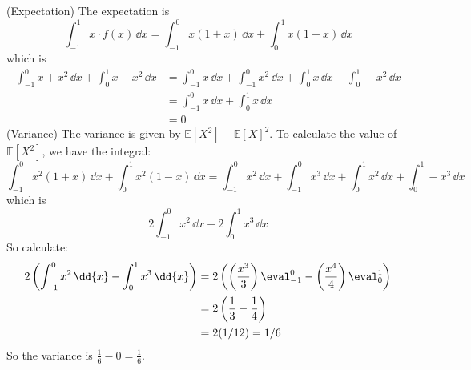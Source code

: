 \documentclass{article}
\begin{document}
\begin{answer}
        (Expectation) The expectation is 
            \begin{equation*}
                \int_{-1}^{1} x \cdot f(x) \, \dd{x} = \int_{-1}^{0} x(1 + x) \, \dd{x} + \int_{0}^{1} x(1 - x) \, \dd{x} 
            \end{equation*}
        which is 
            \begin{align*}
                \int_{-1}^{0} x + x^{2} \, \dd{x} + \int_{0}^{1} x - x^{2} \, \dd{x}  &= \int_{-1}^{0} x \, \dd{x} + \int_{-1}^{0} x^{2} \, \dd{x} + \int_{0}^{1} x \, \dd{x} + \int_{0}^{1} -x^{2} \, \dd{x}  \\
                                                                                      &= \int_{-1}^{0} x \, \dd{x} + \int_{0}^{1} x \, \dd{x}                                                                  \\
                                                                                      &= 0                                                                                                                       
            \end{align*}
        (Variance) The variance is given by $\mathbb{E}[X^{2}] - \mathbb{E}[X]^{2}$. To calculate the value of $\mathbb{E}[X^{2}]$, we have the integral:
            \begin{equation*}
                \int_{-1}^{0} x^{2}(1 + x) \, \dd{x} + \int_{0}^{1} x^{2}(1 - x) \, \dd{x} = \int_{-1}^{0} x^{2} \, \dd{x} + \int_{-1}^{0} x^{3} \, \dd{x} + \int_{0}^{1} x^{2} \, \dd{x}  + \int_{0}^{1} -x^{3} \, \dd{x} 
            \end{equation*}
        which is 
            \begin{equation*}
                2\int_{-1}^{0} x^{2} \, \dd{x} - 2\int_{0}^{1} x^{3} \, \dd{x} 
            \end{equation*}
        So calculate:
            \begin{align*}
                2\left(\int_{-1}^{0} x^{2} \, \dd{x} - \int_{0}^{1} x^{3} \, \dd{x} \right) &= 2\left(\left(\dfrac{x^{3}}{3}\right)\eval_{-1}^{0} - \left(\dfrac{x^{4}}{4}\right)\eval_{0}^{1}\right) \\
                                                                                            &= 2\left(\dfrac{1}{3} - \dfrac{1}{4}\right)                                                             \\
                                                                                            &= 2(1/12) = 1/6
            \end{align*}
        So the variance is $\frac{1}{6} - 0 = \frac{1}{6}$.
    \end{answer}
\end{document}
